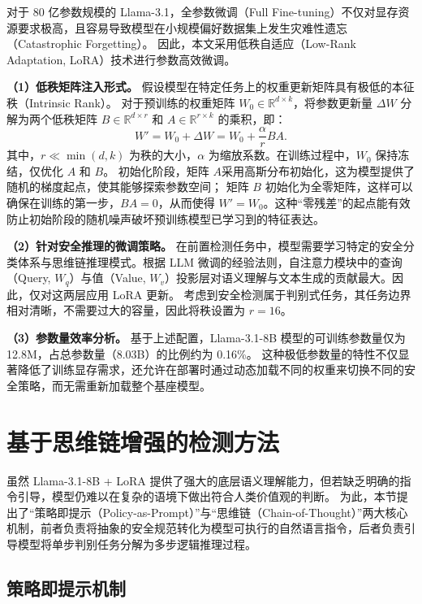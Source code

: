 对于 80 亿参数规模的 Llama-3.1，全参数微调（Full Fine-tuning）不仅对显存资源要求极高，且容易导致模型在小规模偏好数据集上发生灾难性遗忘（Catastrophic Forgetting）。
因此，本文采用低秩自适应（Low-Rank Adaptation, LoRA）技术进行参数高效微调。

\textbf{（1）低秩矩阵注入形式。} 假设模型在特定任务上的权重更新矩阵具有极低的本征秩（Intrinsic Rank）。
对于预训练的权重矩阵 $W_0 \in \mathbb{R}^{d \times k}$，将参数更新量 $\Delta W$ 分解为两个低秩矩阵 $B \in \mathbb{R}^{d \times r}$ 和 $A \in \mathbb{R}^{r \times k}$ 的乘积，即：
\begin{equation}
W' = W_0 + \Delta W = W_0 + \frac{\alpha}{r} B A.
\end{equation}
其中，$r \ll \min(d, k)$ 为秩的大小，$\alpha$ 为缩放系数。在训练过程中，$W_0$ 保持冻结，仅优化 $A$ 和 $B$。
初始化阶段，矩阵 $A$采用高斯分布初始化，这为模型提供了随机的梯度起点，使其能够探索参数空间；
矩阵 $B$ 初始化为全零矩阵，这样可以确保在训练的第一步，$BA = 0$，从而使得 $W' = W_0$。这种“零残差”的起点能有效防止初始阶段的随机噪声破坏预训练模型已学习到的特征表达。

\textbf{（2）针对安全推理的微调策略。} 在前置检测任务中，模型需要学习特定的安全分类体系与思维链推理模式。根据 LLM 微调的经验法则，自注意力模块中的查询（Query, $W_q$）与值（Value, $W_v$）投影层对语义理解与文本生成的贡献最大。因此，仅对这两层应用 LoRA 更新。
考虑到安全检测属于判别式任务，其任务边界相对清晰，不需要过大的容量，因此将秩设置为 $r=16$。

\textbf{（3）参数量效率分析。} 基于上述配置，Llama-3.1-8B 模型的可训练参数量仅为 12.8M，占总参数量（8.03B）的比例约为 0.16\%。
这种极低参数量的特性不仅显著降低了训练显存需求，还允许在部署时通过动态加载不同的权重来切换不同的安全策略，而无需重新加载整个基座模型。

\section{基于思维链增强的检测方法}

虽然 Llama-3.1-8B + LoRA 提供了强大的底层语义理解能力，但若缺乏明确的指令引导，模型仍难以在复杂的语境下做出符合人类价值观的判断。
为此，本节提出了“策略即提示（Policy-as-Prompt）”与“思维链（Chain-of-Thought）”两大核心机制，前者负责将抽象的安全规范转化为模型可执行的自然语言指令，后者负责引导模型将单步判别任务分解为多步逻辑推理过程。

\subsection{策略即提示机制}

